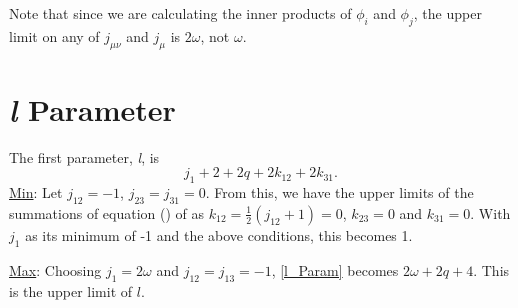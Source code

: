 \documentclass[Dissertation.tex]{subfiles}
\begin{document}
Note that since we are calculating the inner products of $\phi_i$ and $\phi_j$,
the upper limit on any of $j_{\mu \nu}$ and $j_{\mu}$ is $2\omega$, not
$\omega$.

\section{\emph{l} Parameter}
The first parameter, \emph{l}, is
\begin{equation}
	\label{l_Param}j_1 + 2 + 2q + 2 k_{12} + 2 k_{31}.
\end{equation}
\underline{Min}: Let $j_{12} = -1$, $j_{23} = j_{31} = 0$.  From this, we 
have the upper limits of the summations of equation () of \cite{Drake1995} as 
$k_{12} = \tfrac{1}{2} (j_{12} + 1) = 0$, $k_{23} = 0$ and $k_{31} = 0$. With 
$j_1$ as its minimum of -1 and the above conditions, this becomes 1.

\noindent\underline{Max}: Choosing $j_1 = 2 \omega$ and $j_{12} = j_{13} = -1$, \cref{l_Param} becomes $2 \omega + 2q + 4$.  This is the upper limit of $l$.
\end{document}
